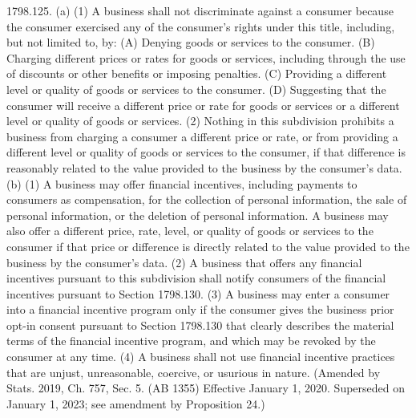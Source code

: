 1798.125.  (a) (1) A business shall not discriminate against a consumer because the consumer exercised any of the consumer’s rights under this title, including, but not limited to, by:
(A) Denying goods or services to the consumer.
(B) Charging different prices or rates for goods or services, including through the use of discounts or other benefits or imposing penalties.
(C) Providing a different level or quality of goods or services to the consumer.
(D) Suggesting that the consumer will receive a different price or rate for goods or services or a different level or quality of goods or services.
(2) Nothing in this subdivision prohibits a business from charging a consumer a different price or rate, or from providing a different level or quality of goods or services to the consumer, if that difference is reasonably related to the value provided to the business by the consumer’s data.
(b) (1) A business may offer financial incentives, including payments to consumers as compensation, for the collection of personal information, the sale of personal information, or the deletion of personal information. A business may also offer a different price, rate, level, or quality of goods or services to the consumer if that price or difference is directly related to the value provided to the business by the consumer’s data.
(2) A business that offers any financial incentives pursuant to this subdivision shall notify consumers of the financial incentives pursuant to Section 1798.130.
(3) A business may enter a consumer into a financial incentive program only if the consumer gives the business prior opt-in consent pursuant to Section 1798.130 that clearly describes the material terms of the financial incentive program, and which may be revoked by the consumer at any time.
(4) A business shall not use financial incentive practices that are unjust, unreasonable, coercive, or usurious in nature.
(Amended by Stats. 2019, Ch. 757, Sec. 5. (AB 1355) Effective January 1, 2020. Superseded on January 1, 2023; see amendment by Proposition 24.)

